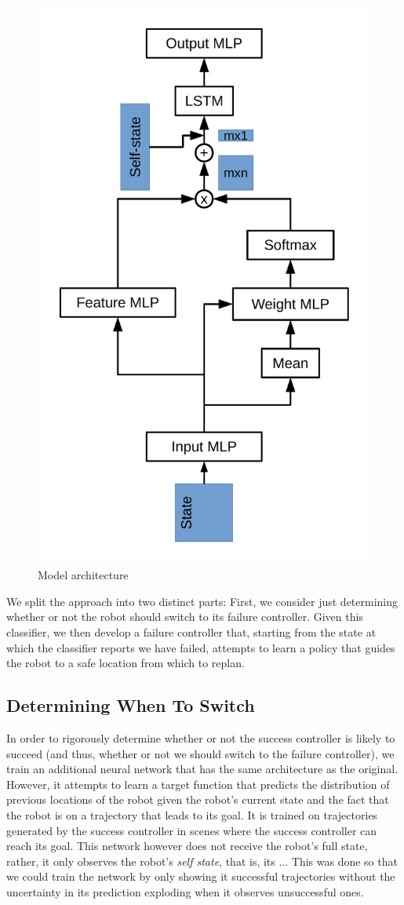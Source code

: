\documentclass[letterpaper, 10 pt, conference]{ieeeconf}  %
\begin{document}
	\begin{figure}
		\centering
		\includegraphics[height=\linewidth, angle=270]{model_arch.pdf}
		\caption{Model architecture}
		\label{fig:model_arch}
	\end{figure}
	
	We split the approach into two distinct parts: First, we consider just determining whether or not the robot should switch to its failure controller. Given this classifier, we then develop a failure controller that, starting from the state at which the classifier reports we have failed, attempts to learn a policy that guides the robot to a safe location from which to replan.
	
	\subsection{Determining When To Switch}
		In order to rigorously determine whether or not the success controller is likely to succeed (and thus, whether or not we should switch to the failure controller), we train an additional neural network that has the same architecture as the original. However, it attempts to learn a target function that predicts the distribution of previous locations of the robot given the robot's current state and the fact that the robot is on a trajectory that leads to its goal. It is trained on trajectories generated by the success controller in scenes where the success controller can reach its goal. This network however does not receive the robot's full state, rather, it only observes the robot's \textit{self state}, that is, its ... This was done so that we could train the network by only showing it successful trajectories without the uncertainty in its prediction exploding when it observes unsuccessful ones. 
		
\end{document}
